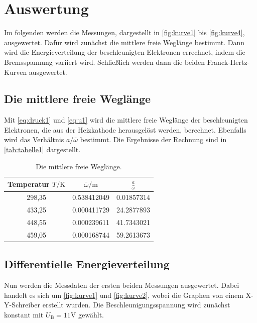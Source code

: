\section{Auswertung}
\label{sec:Auswertung}

Im folgenden werden die Messungen, dargestellt in \autoref{fig:kurve1} bis \autoref{fig:kurve4}, ausgewertet.
Dafür wird zunächst die mittlere freie Weglänge bestimmt.
Dann wird die Energieverteilung der beschleunigten Elektronen errechnet, indem die Bremsspannung variiert wird.
Schließlich werden dann die beiden Franck-Hertz-Kurven ausgewertet.


\subsection{Die mittlere freie Weglänge}
Mit \autoref{eq:druck1} und \autoref{eq:u1} wird die mittlere freie Weglänge der beschleunigten Elektronen,
die aus der Heizkathode herausgelöst werden, berechnet.
Ebenfalls wird das Verhältnis $a / \bar{\omega}$ bestimmt.
Die Ergebnisse der Rechnung sind in \autoref{tab:tabelle1} dargestellt.

\begin{table} [H]
  \centering
  \caption{Die mittlere freie Weglänge.}
  \label{tab:tabelle1}
  \begin{tabular}{c c c}
      \toprule
      Temperatur $T / \unit\kelvin$ & $\bar{\omega} / \unit\meter$ & $\frac{a}{\bar{\omega}}$ \\
      \midrule 
      298,35 & 0.538412049 & 0.01857314\\
      433,25 & 0.000411729 & 24.2877893\\
      448,55 & 0.000239611 & 41.7343021\\
      459,05 & 0.000168744 & 59.2613673\\
      \bottomrule
  \end{tabular}
\end{table}

\subsection{Differentielle Energieverteilung}
Nun werden die Messdaten der ersten beiden Messungen ausgewertet.
Dabei handelt es sich um \autoref{fig:kurve1} und \autoref{fig:kurve2}, wobei die Graphen von einem X-Y-Schreiber erstellt wurden.
Die Beschleunigungsspannung wird zunächst konstant mit $U_\text{B} = 11 \unit\V$ gewählt.

